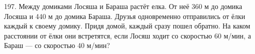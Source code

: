197. Между домиками Лосяша и Бараша растёт елка. От неё 360 м до домика Лосяша и 440 м до домика Бараша. Друзья одновременно отправились от ёлки каждый к своему домику. Придя домой, каждый сразу пошел обратно. На каком расстоянии от ёлки они встретятся, если Лосяш ходит со скоростью 60 м/мин, а Бараш --- со скоростью 40 м/мин?\\
